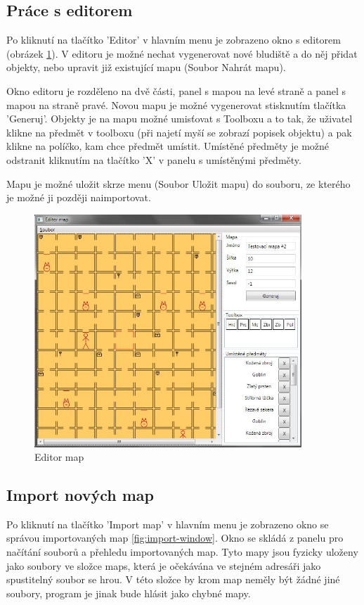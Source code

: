 \documentclass[11pt,a4paper]{scrartcl}
\begin{document}
	\subsection{Práce s editorem}
	Po kliknutí na tlačítko 'Editor' v hlavním menu je zobrazeno okno s editorem (obrázek \ref{fig:editor-window}). V editoru je možné nechat vygenerovat nové bludiště a do něj přidat objekty, nebo upravit již existující mapu (Soubor \textrightarrow Nahrát mapu).
	
	Okno editoru je rozděleno na dvě části, panel s mapou na levé straně a panel s mapou na straně pravé. Novou mapu je možné vygenerovat stisknutím tlačítka 'Generuj'. Objekty je na mapu možné umisťovat s Toolboxu a to tak, že uživatel klikne na předmět v toolboxu (při najetí myší se zobrazí popisek objektu) a pak klikne na políčko, kam chce předmět umístit. Umístěné předměty je možné odstranit kliknutím na tlačítko 'X' v panelu s umístěnými předměty.
	
	Mapu je možné uložit skrze menu (Soubor \textrightarrow Uložit mapu) do souboru, ze kterého je možné ji později naimportovat.
	
	\begin{figure}[H]
		\centering
		\includegraphics[width=380px]{editor-window}
		\caption{Editor map}
		\label{fig:editor-window}
	\end{figure}
	
	\subsection{Import nových map}
	\label{subsec:map-import}
	Po kliknutí na tlačítko 'Import map' v hlavním menu je zobrazeno okno se správou importovaných map \ref{fig:import-window}. Okno se skládá z panelu pro načítání souborů a přehledu importovaných map. Tyto mapy jsou fyzicky uloženy jako soubory ve složce maps, která je očekávána ve stejném adresáři jako spustitelný soubor se hrou. V této složce by krom map neměly být žádné jiné soubory, program je jinak bude hlásit jako chybné mapy.
	
\end{document}
